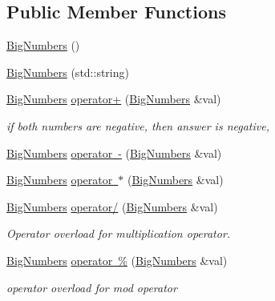 \subsection*{Public Member Functions}
\begin{DoxyCompactItemize}
\item 
\mbox{\hyperlink{class_big_numbers_1_1_big_numbers_a87037d5faa0bf5253b6e8fc7fc54324c}{Big\+Numbers}} ()
\item 
\mbox{\hyperlink{class_big_numbers_1_1_big_numbers_a4dcfaac3c63a377ef04a6b5e6bd2fc68}{Big\+Numbers}} (std\+::string)
\item 
\mbox{\hyperlink{class_big_numbers_1_1_big_numbers}{Big\+Numbers}} \mbox{\hyperlink{class_big_numbers_1_1_big_numbers_a5083165e6ad1d017a4cf2e470c66bdff}{operator+}} (\mbox{\hyperlink{class_big_numbers_1_1_big_numbers}{Big\+Numbers}} \&val)
\begin{DoxyCompactList}\small\item\em if both numbers are negative, then answer is negative, \end{DoxyCompactList}\item 
\mbox{\hyperlink{class_big_numbers_1_1_big_numbers}{Big\+Numbers}} \mbox{\hyperlink{class_big_numbers_1_1_big_numbers_ab72d9ad5f9eafd871a6c886aa030363b}{operator -\/}} (\mbox{\hyperlink{class_big_numbers_1_1_big_numbers}{Big\+Numbers}} \&val)
\item 
\mbox{\hyperlink{class_big_numbers_1_1_big_numbers}{Big\+Numbers}} \mbox{\hyperlink{class_big_numbers_1_1_big_numbers_afca660b90d4ff79406328e6c47b35f02}{operator $\ast$}} (\mbox{\hyperlink{class_big_numbers_1_1_big_numbers}{Big\+Numbers}} \&val)
\item 
\mbox{\hyperlink{class_big_numbers_1_1_big_numbers}{Big\+Numbers}} \mbox{\hyperlink{class_big_numbers_1_1_big_numbers_ae71572550fb1f47d3659cf2cefd04534}{operator/}} (\mbox{\hyperlink{class_big_numbers_1_1_big_numbers}{Big\+Numbers}} \&val)
\begin{DoxyCompactList}\small\item\em Operator overload for multiplication operator. \end{DoxyCompactList}\item 
\mbox{\hyperlink{class_big_numbers_1_1_big_numbers}{Big\+Numbers}} \mbox{\hyperlink{class_big_numbers_1_1_big_numbers_a1d560da134a5d46f0b98d5d1d2133f86}{operator \%}} (\mbox{\hyperlink{class_big_numbers_1_1_big_numbers}{Big\+Numbers}} \&val)
\begin{DoxyCompactList}\small\item\em operator overload for mod operator \end{DoxyCompactList}\item 

\end{DoxyCompactItemize}
